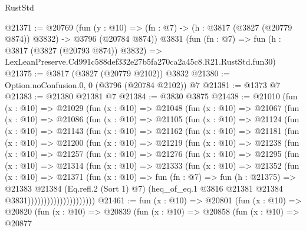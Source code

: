 \begin{lexlean}{RustStd}
\begin{coremodule}
@21371 := @20769
    (fun (y : @10) => (fn : @7) -> (h : @3817 (@3827 (@20779 @874)) @3832) -> @3796 (@20784 @874))
    @3831
    (fun (fn : @7) =>
    fun (h : @3817 (@3827 (@20793 @874)) @3832) =>
    LexLeanPreserve.Cd991c588def332e27b5fa270ca2a45c8.R21.RustStd.fun30)
@21375 := @3817 (@3827 (@20779 @2102)) @3832
@21380 := Option.noConfusion.{0, 0} (@3796 (@20784 @2102)) @7
@21381 := @1373 @7
@21383 := @21380 @21381 @7
@21384 := @3830 @3875
@21438 := @21010
    (fun (x : @10) =>
    @21029
      (fun (x : @10) =>
      @21048
        (fun (x : @10) =>
        @21067
          (fun (x : @10) =>
          @21086
            (fun (x : @10) =>
            @21105
              (fun (x : @10) =>
              @21124
                (fun (x : @10) =>
                @21143
                  (fun (x : @10) =>
                  @21162
                    (fun (x : @10) =>
                    @21181
                      (fun (x : @10) =>
                      @21200
                        (fun (x : @10) =>
                        @21219
                          (fun (x : @10) =>
                          @21238
                            (fun (x : @10) =>
                            @21257
                              (fun (x : @10) =>
                              @21276
                                (fun (x : @10) =>
                                @21295
                                  (fun (x : @10) =>
                                  @21314
                                    (fun (x : @10) =>
                                    @21333
                                      (fun (x : @10) =>
                                      @21352
                                        (fun (x : @10) =>
                                        @21371
                                          (fun (x : @10) =>
                                          fun (fn : @7) =>
                                          fun (h : @21375) =>
                                          @21383
                                            @21384
                                            (Eq.refl.{2} (Sort 1) @7)
                                            (heq_of_eq.{1}
                                              @3816
                                              @21381
                                              @21384
                                              @3831)))))))))))))))))))))
@21461 := fun (x : @10) =>
  @20801
    (fun (x : @10) =>
    @20820
      (fun (x : @10) =>
      @20839
        (fun (x : @10) =>
        @20858
          (fun (x : @10) =>
          @20877

\end{coremodule}
\end{lexlean}
